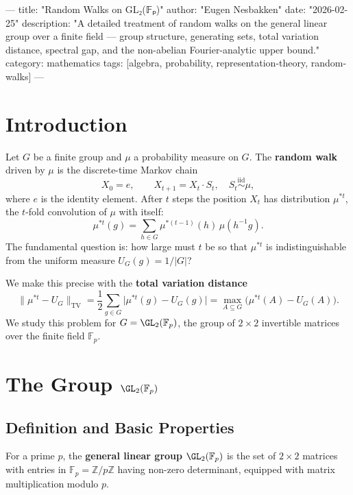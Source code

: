 ---
title: "Random Walks on GL₂(𝔽ₚ)"
author: "Eugen Nesbakken"
date: "2026-02-25"
description: "A detailed treatment of random walks on the general linear group over a finite field — group structure, generating sets, total variation distance, spectral gap, and the non-abelian Fourier-analytic upper bound."
category: mathematics
tags: [algebra, probability, representation-theory, random-walks]
---

\section{Introduction}

Let $G$ be a finite group and $\mu$ a probability measure on $G$.
The \textbf{random walk} driven by $\mu$ is the discrete-time Markov chain
\[
  X_0 = e, \qquad X_{t+1} = X_t \cdot S_t, \quad S_t \overset{\mathrm{iid}}{\sim} \mu,
\]
where $e$ is the identity element.
After $t$ steps the position $X_t$ has distribution $\mu^{*t}$, the $t$-fold
convolution of $\mu$ with itself:
\[
  \mu^{*t}(g) = \sum_{h \in G} \mu^{*(t-1)}(h)\,\mu(h^{-1}g).
\]
The fundamental question is: how large must $t$ be so that $\mu^{*t}$ is
indistinguishable from the uniform measure $U_G(g) = 1/|G|$?

We make this precise with the \textbf{total variation distance}
\[
  \|\mu^{*t} - U_G\|_{\mathrm{TV}}
  = \frac{1}{2}\sum_{g \in G}\bigl|\mu^{*t}(g) - U_G(g)\bigr|
  = \max_{A \subseteq G}\bigl(\mu^{*t}(A) - U_G(A)\bigr).
\]
We study this problem for $G = \GL_2(\mathbb{F}_p)$, the group of $2 \times 2$
invertible matrices over the finite field $\mathbb{F}_p$.

\section{The Group \texorpdfstring{$\GL_2(\mathbb{F}_p)$}{GL2(Fp)}}

\subsection{Definition and Basic Properties}

\begin{definition}[$\GL_2(\mathbb{F}_p)$]
For a prime $p$, the \textbf{general linear group} $\GL_2(\mathbb{F}_p)$ is the
set of $2 \times 2$ matrices with entries in $\mathbb{F}_p = \mathbb{Z}/p\mathbb{Z}$
having non-zero determinant, equipped with matrix multiplication modulo $p$.
\end{definition}

